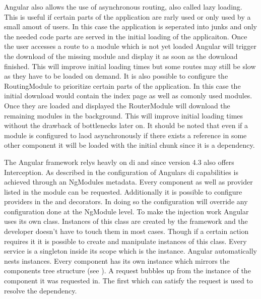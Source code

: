 Angular also allows the use of asynchronous routing, also called lazy loading. This is useful if certain parts of the application are rarly used or only used by a small amout of users. In this case the application is seperated into junks and only the needed code parts are served in the initial loading of the applicaiton. Once the user accesses a route to a module which is not yet loaded Angular will trigger the download of the missing module and display it as soon as the download finished. This will improve initial loading times but some routes may still be slow as they have to be loaded on demand. It is also possible to configure the RoutingModule to prioritize certain parts of the application. In this case the initial download would contain the index page as well as comonly used modules. Once they are loaded and displayed the RouterModule will download the remaining modules in the background. This will improve initial loading times without the drawback of bottlenecks later on. It should be noted that even if a module is configured to laod asynchronously if there exists a reference in some other component it will be loaded with the initial chunk since it is a dependency.


The Angular framework relys heavly on \gls{di} and since version 4.3 \cite{interceptorAngularVersion} also offers Interception. As described in  the configuration of Angulars \gls{di} capabilities is achieved through an NgModules metadata. Every component as well as provider listed in the module can be requested. Additionally it is possible to configure providers in the  and  decorators. In doing so the configuration will override any configuration done at the NgModule level. To make the injection work Angular uses its own  class. Instances of this class are created by the framework and the developer doesn't have to touch them in most cases. Though if a certain action requires it it is possible to create and manipulate instances of this class. Every service is a singleton inside its scope which is the  instance. Angular automatically nests  instances. Every component has its own  instance which mirrors the components tree structure (see ). A request bubbles up from the  instance of the component it was requested in. The first  which can satisfy the request is used to resolve the dependency.

